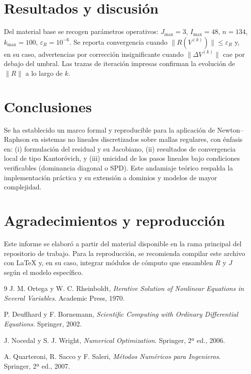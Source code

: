 \documentclass[12pt,letterpaper]{article}
\theoremstyle{definition}
\theoremstyle{remark}
\newcommand{\norm}[1]{\lVert #1\rVert}
\begin{document}
\section{Resultados y discusión}
Del material base se recogen parámetros operativos: $J_{\max}=3$, $I_{\max}=48$, $n=134$, $k_{\max}=100$, $\varepsilon_R=10^{-6}$. Se reporta convergencia cuando $\norm{R(V^{(k)})}\le \varepsilon_R$ y, en su caso, advertencias por corrección insignificante cuando $\norm{\Delta V^{(k)}}$ cae por debajo del umbral. Las trazas de iteración impresas confirman la evolución de $\norm{R}$ a lo largo de $k$.

\section{Conclusiones}
Se ha establecido un marco formal y reproducible para la aplicación de Newton--Raphson en sistemas no lineales discretizados sobre mallas regulares, con énfasis en: (i) formulación del residual y su Jacobiano, (ii) resultados de convergencia local de tipo Kantoróvich, y (iii) unicidad de los pasos lineales bajo condiciones verificables (dominancia diagonal o SPD). Este andamiaje teórico respalda la implementación práctica y su extensión a dominios y modelos de mayor complejidad.

\section*{Agradecimientos y reproducción}
Este informe se elaboró a partir del material disponible en la rama principal del repositorio de trabajo. Para la reproducción, se recomienda compilar este archivo con \LaTeX{} y, en su caso, integrar módulos de cómputo que ensamblen $R$ y $J$ según el modelo específico.

\begin{thebibliography}{9}
J. M. Ortega y W. C. Rheinboldt, \emph{Iterative Solution of Nonlinear Equations in Several Variables}. Academic Press, 1970.

P. Deuflhard y F. Bornemann, \emph{Scientific Computing with Ordinary Differential Equations}. Springer, 2002.

J. Nocedal y S. J. Wright, \emph{Numerical Optimization}. Springer, 2ª ed., 2006.

A. Quarteroni, R. Sacco y F. Saleri, \emph{Métodos Numéricos para Ingenieros}. Springer, 2ª ed., 2007.
\end{thebibliography}
\end{document}
